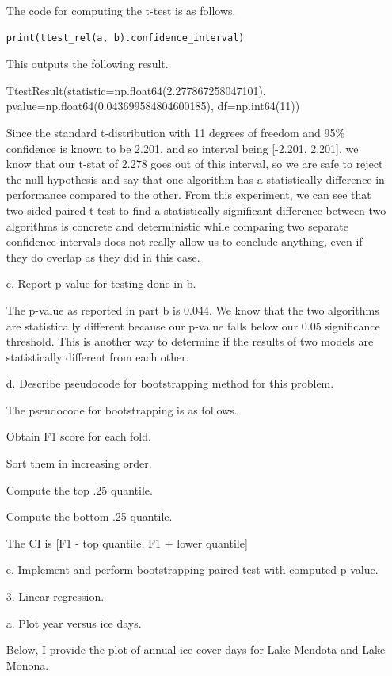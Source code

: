\documentclass[12pt]{report}
\begin{document}
\begin{enumerate}
  The code for computing the t-test is as follows.
\begin{verbatim}
print(ttest_rel(a, b).confidence_interval)
\end{verbatim}
This outputs the following result.

TtestResult(statistic=np.float64(2.277867258047101),
pvalue=np.float64(0.043699584804600185), df=np.int64(11))

Since the standard t-distribution with 11 degrees of freedom and 95\% confidence
is known to be 2.201, and so interval being [-2.201, 2.201], we know that our
t-stat of 2.278 goes out of this interval, so we are safe to reject the null
hypothesis and say that one algorithm has a statistically difference in
performance compared to the other. From this experiment, we can see that
two-sided paired t-test to find a statistically significant difference
between two algorithms is concrete and deterministic while comparing two
separate confidence intervals does not really allow us to conclude anything,
even if they do overlap as they did in this case.

\item[c.] Report p-value for testing done in b.

  The p-value as reported in part b is 0.044. We know that the two algorithms
  are statistically different because our p-value falls below our 0.05
  significance threshold. This is another way to determine if the results of two
  models are statistically different from each other.
\item[d.] Describe pseudocode for bootstrapping method for this problem.

  The pseudocode for bootstrapping is as follows.

  Obtain F1 score for each fold.

  Sort them in increasing order.

  Compute the top .25 quantile.

  Compute the bottom .25 quantile.

  The CI is [F1 - top quantile, F1 + lower quantile]

\item[e.] Implement and perform bootstrapping paired test with computed p-value.

  \newpage
\item[3.] Linear regression.

\item[a.] Plot year versus ice days.

  Below, I provide the plot of annual ice cover days for Lake Mendota and Lake
  Monona.


\end{enumerate}
\end{document}
